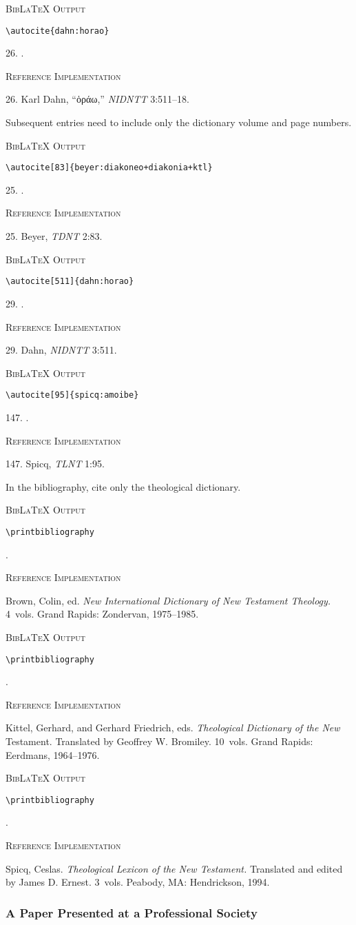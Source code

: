 \documentclass[a4paper]{article}
\newcommand{\gr}[1]{{\greekfont #1}}
\newcommand\citetestlex[2]{%
  {\textsc{BibLaTeX Output}\par
   \nobreak
   \texttt{\textbackslash autocite\{#2\}}\par
   \color{biblatex-colour}
   #1. \cite{#2}.\par}}
\newcommand\citetestlexns[3]{%
  {\textsc{BibLaTeX Output}\par
   \nobreak
   \texttt{\textbackslash autocite[#2]\{#3\}}\par
   \color{biblatex-colour}
   #1. \cite[#2]{#3}.\par}}
\newcommand\citetestonlybib[1]{%
  {\textsc{BibLaTeX Output}\par
   \nobreak
   \color{black}
   \texttt{\textbackslash printbibliography}\par
   \color{biblatex-colour}
   \hangindent\bibindent\bibentrycite{#1}.\par}}
\newenvironment{refimp}{%
  \begin{minipage}{\linewidth}
    \setlength{\parskip}{1ex}
    \textsc{Reference Implementation}\par
    \nobreak
    \color{reference-colour}
}{\end{minipage}}
\begin{document}
\citetestlex{26}{dahn:horao}

\begin{refimp}
  26. Karl Dahn, “\gr{ὁράω},” \emph{NIDNTT} 3:511–18.
\end{refimp}

\bigskip

Subsequent entries need to include only the dictionary volume and page
numbers.

\citetestlexns{25}{83}{beyer:diakoneo+diakonia+ktl}

\begin{refimp}
  25. Beyer, \emph{TDNT} 2:83.
\end{refimp}

\citetestlexns{29}{511}{dahn:horao}

\begin{refimp}
  29. Dahn, \emph{NIDNTT} 3:511.
\end{refimp}

\citetestlexns{147}{95}{spicq:amoibe}

\begin{refimp}
  147. Spicq, \emph{TLNT} 1:95.
\end{refimp}

\bigskip

In the bibliography, cite only the theological dictionary.

\citetestonlybib{NIDNTT}

\begin{refimp}
  \hangindent\bibindent Brown, Colin, ed. \emph{New International Dictionary
  of New Testament Theology.} 4~vols. Grand Rapids: Zondervan, 1975–1985.
\end{refimp}

\citetestonlybib{TDNT}

\begin{refimp}
  \hangindent\bibindent Kittel, Gerhard, and Gerhard Friedrich, eds.
  \emph{Theological Dictionary of the New} Testament. Translated by Geoffrey
  W. Bromiley. 10~vols. Grand Rapids: Eerdmans, 1964–1976.
\end{refimp}

\citetestonlybib{TLNT}

\begin{refimp}
  \hangindent\bibindent Spicq, Ceslas. \emph{Theological Lexicon of the New
  Testament.} Translated and edited by James D. Ernest. 3~vols. Peabody, MA:
  Hendrickson, 1994.
\end{refimp}

\subsubsection{A Paper Presented at a Professional Society}
\end{document}
